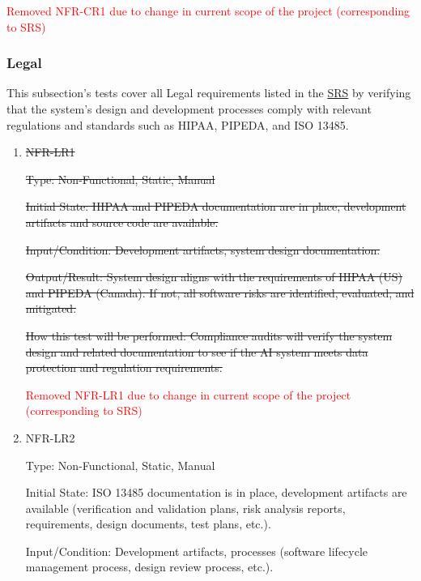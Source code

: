 \documentclass[12pt, titlepage]{article}
\begin{document}
\begin{enumerate}
\begin{enumerate}
\begin{enumerate}
\begin{enumerate}
\end{enumerate}

\textcolor{red}{Removed NFR-CR1 due to change in current scope of the project (corresponding to SRS)}

\subsubsection{Legal}

This subsection's tests cover all Legal requirements listed in the \href{https://github.com/RezaJodeiri/CXR-Capstone/blob/main/docs/SRS/SRS.pdf}{SRS} \citep{SRS}
 by verifying that the system's design and development processes comply with relevant regulations and standards such as HIPAA, PIPEDA, and ISO 13485.

\begin{enumerate}

\item{\sout{NFR-LR1}\\}\label{NFR-LR1}

\sout{Type: Non-Functional, Static, Manual}

\sout{Initial State: HIPAA and PIPEDA documentation are in place, development artifacts and source code are available.}

\sout{Input/Condition: Development artifacts, system design documentation.}

\sout{Output/Result: System design aligns with the requirements of HIPAA (US) and PIPEDA (Canada). If not, all software risks are identified, evaluated, and mitigated.}

\sout{How this test will be performed: Compliance audits will verify the system design and related documentation to see if the AI system meets data protection and regulation requirements.}


\textcolor{red}{Removed NFR-LR1 due to change in current scope of the project (corresponding to SRS)}

\item{NFR-LR2\\}\label{NFR-LR2}

Type: Non-Functional, Static, Manual

Initial State: ISO 13485 documentation is in place, development artifacts are available (verification and validation plans, risk analysis reports, requirements, design documents, test plans, etc.).

Input/Condition: Development artifacts, processes (software lifecycle management process, design review process, etc.).


\end{enumerate}
\end{enumerate}
\end{enumerate}
\end{enumerate}
\end{document}

